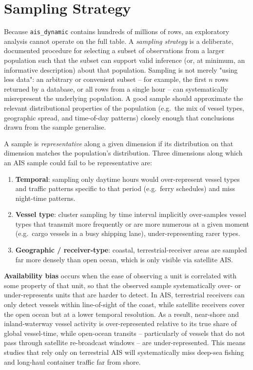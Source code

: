 \documentclass[11pt,a4paper]{article}
\begin{document}
\section{Sampling Strategy}
\label{sec:sampling}

Because \texttt{ais\_dynamic} contains hundreds of millions of rows, an
exploratory analysis cannot operate on the full table. A \emph{sampling
strategy} is a deliberate, documented procedure for selecting a subset of
observations from a larger population such that the subset can support valid
inference (or, at minimum, an informative description) about that population.
Sampling is not merely "using less data": an arbitrary or convenient subset --
for example, the first $n$ rows returned by a database, or all rows from a
single hour -- can systematically misrepresent the underlying population. A good
sample should approximate the relevant distributional properties of the
population (e.g.\ the mix of vessel types, geographic spread, and time-of-day
patterns) closely enough that conclusions drawn from the sample generalise.

A sample is \emph{representative} along a given dimension if its distribution on
that dimension matches the population's distribution. Three dimensions along
which an AIS sample could fail to be representative are:

\begin{enumerate}[noitemsep]
  \item \textbf{Temporal}: sampling only daytime hours would over-represent
        vessel types and traffic patterns specific to that period (e.g.\ ferry
        schedules) and miss night-time patterns.
  \item \textbf{Vessel type}: cluster sampling by time interval implicitly
        over-samples vessel types that transmit more frequently or are more
        numerous at a given moment (e.g.\ cargo vessels in a busy shipping lane),
        under-representing rarer types.
  \item \textbf{Geographic / receiver-type}: coastal, terrestrial-receiver areas
        are sampled far more densely than open ocean, which is only visible via
        satellite AIS.
\end{enumerate}

\textbf{Availability bias} occurs when the ease of observing a unit is
correlated with some property of that unit, so that the observed sample
systematically over- or under-represents units that are harder to detect. In
AIS, terrestrial receivers can only detect vessels within line-of-sight of the
coast, while satellite receivers cover the open ocean but at a lower temporal
resolution. As a result, near-shore and inland-waterway vessel activity is
over-represented relative to its true share of global vessel-time, while
open-ocean transits -- particularly of vessels that do not pass through
satellite re-broadcast windows -- are under-represented. This means studies that
rely only on terrestrial AIS will systematically miss deep-sea fishing and
long-haul container traffic far from shore.
\end{document}
